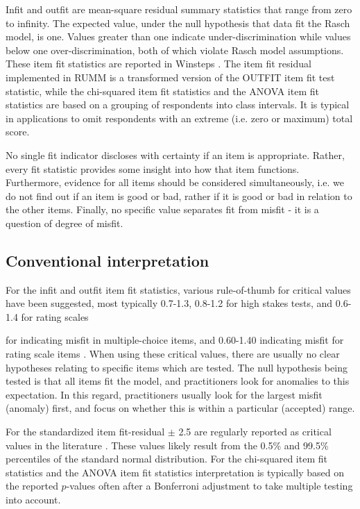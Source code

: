 \documentclass{article}
\begin{document}
Infit and outfit are mean-square residual summary statistics that range from zero to infinity. The expected value, under the null hypothesis that data fit the Rasch model, is one. Values greater than one indicate under-discrimination while values below one over-discrimination, both of which violate Rasch model assumptions. These item fit statistics are reported in Winsteps \cite{winsteps}. The item fit residual implemented in RUMM \cite{RUMM} is a transformed version of the OUTFIT item fit test statistic, while the chi-squared item fit statistics and the ANOVA item fit statistics are based on a grouping of respondents into class intervals. It is typical in applications to omit respondents with an extreme (i.e. zero or maximum) total score.


No single fit indicator discloses with certainty if an item is appropriate. Rather, every fit statistic provides some insight into how that item functions. Furthermore, evidence for all items should be considered simultaneously, i.e. we do not find out if an item is good or bad, rather if it is good or bad in relation to the other items. Finally, no specific value separates fit from misfit - it is a question of degree of misfit.



\subsection{Conventional interpretation}


For the infit and outfit item fit statistics, various rule-of-thumb for critical values have been suggested, most typically
0.7-1.3, 0.8-1.2 for high stakes tests, and 0.6-1.4 for rating scales \cite{bondfox}


for indicating misfit in multiple-choice items, and 0.60-1.40 indicating misfit for rating scale items \cite{wright-linacre1994}. When using these critical values, there are usually no clear hypotheses relating to specific items which are tested. The null hypothesis being tested is that all items fit the model, and practitioners look for anomalies to this expectation. In this regard, practitioners usually look for the largest misfit (anomaly) first, and focus on whether this is within a particular (accepted) range.


For the standardized item fit-residual $\pm$ 2.5 are regularly reported as critical values in the literature \cite{Smith2000,Mokkink_2006,Marais2008c}. These values likely result from the 0.5\% and 99.5\% percentiles of the standard normal distribution. For the chi-squared item fit statistics and the ANOVA item fit statistics interpretation is typically based on the reported $p$-values often after a Bonferroni adjustment to take multiple testing into account.
\end{document}
